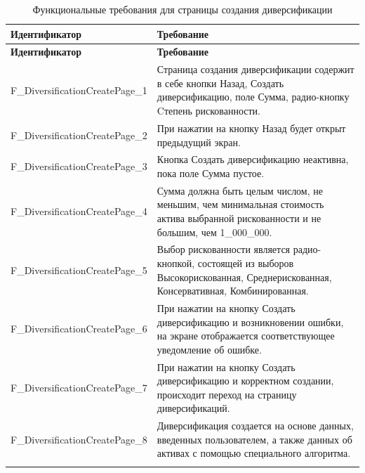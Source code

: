 \documentclass[a4paper, 14pt]{article}
\begin{document}
\begin{longtable}{| p{} | p{} |}
    \hline
    \textbf{Идентификатор}          & \textbf{Требование}                                                                                                                                                                \\
    \hline
    \endfirsthead
    \hline
    \textbf{Идентификатор}          & \textbf{Требование}                                                                                                                                                                \\
    \hline
    \endhead

    F\_DiversificationCreatePage\_1 & Страница создания диверсификации содержит в себе кнопки Назад, Создать диверсификацию, поле Сумма, радио-кнопку Cтепень рискованности.                                                          \\ \hline
    F\_DiversificationCreatePage\_2 & При нажатии на кнопку Назад будет открыт предыдущий экран.                                                                                                                         \\ \hline
    F\_DiversificationCreatePage\_3 & Кнопка Создать диверсификацию неактивна, пока поле Сумма пустое.                                                                                                                   \\ \hline
    F\_DiversificationCreatePage\_4 & Сумма должна быть целым числом, не меньшим, чем минимальная стоимость актива выбранной рискованности и не большим, чем 1\_000\_000.                                                                                                                   \\ \hline
    F\_DiversificationCreatePage\_5 & Выбор рискованности является радио-кнопкой, состоящей из выборов Высокорискованная, Среднерискованная, Консервативная, Комбинированная.                                            \\ \hline
    F\_DiversificationCreatePage\_6 & При нажатии на кнопку Создать диверсификацию и возникновении ошибки, на экране отображается соответствующее уведомление об ошибке.                           \\ \hline
    F\_DiversificationCreatePage\_7 & При нажатии на кнопку Создать диверсификацию и корректном создании, происходит переход на страницу диверсификаций.                                                                 \\ \hline
    F\_DiversificationCreatePage\_8 & Диверсификация создается на основе данных, введенных пользователем, а также данных об активах с помощью специального алгоритма.                                                                 \\ \hline

    \caption{Функциональные требования для страницы создания диверсификации}
\end{longtable}
\end{document}
